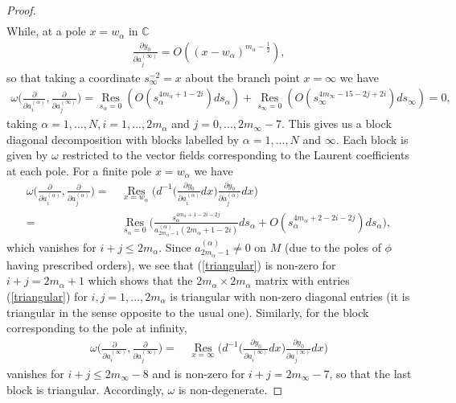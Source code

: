 \documentclass[a4paper,12pt,reqno]{amsart}
\numberwithin{equation}{section}
\numberwithin{counter2}{section}
\begin{document}
\begin{proof}
\begin{align}
\end{align}
While,  at a pole $x = w_\alpha$ in $\mathbb{C}$ 
\begin{align}\label{order_diff_inf_2}
\frac{\partial y_0}{\partial a_j^{(\infty)}} = O((x-w_\alpha)^{m_\alpha - \frac{1}{2}}),
\end{align}
so that taking a coordinate $s_\infty^{-2} = x$ about the branch point $x = \infty$ we have 
\begin{align}
\omega\bigg(\frac{\partial }{\partial a_i^{(\alpha)}},  \frac{\partial }{\partial a_j^{(\infty)}} \bigg) = \underset{s_\alpha=0}{\operatorname{Res}}(O(s_\alpha^{4m_\alpha+1-2i})ds_\alpha) + \underset{s_\infty = 0}{\operatorname{Res}}(O(s_\infty^{4m_\infty - 15 - 2j + 2i})ds_\infty)=0,
\end{align}
taking $\alpha = 1,...,N,  i = 1,...,2m_\alpha$ and $j = 0,..., 2m_\infty - 7$.  This gives us a block diagonal decomposition with blocks labelled by $\alpha = 1,...,N$ and $\infty$.  Each block is given by $\omega$ restricted to the vector fields corresponding to the Laurent coefficients at each pole.  For a finite pole $x = w_\alpha$ we have
\begin{align}\label{triangular}
\omega\bigg(\frac{\partial }{\partial a_i^{(\alpha)}},  \frac{\partial }{\partial a_j^{(\alpha)}} \bigg) \nonumber = \,  &\underset{x = w_\alpha}{\operatorname{Res}} \bigg(  d^{-1} \bigg( \frac{\partial y_0}{\partial a_i^{(\alpha)}}  dx \bigg)  \frac{\partial y_0}{\partial a_j^{(\alpha)}} dx \bigg) \\ = \,  &\underset{s_\alpha = 0}{\operatorname{Res}}\bigg( \frac{s_\alpha^{4m_\alpha+1-2i-2j}}{a^{(\alpha)}_{2m_\alpha-1}(2m_\alpha+1-2i)}ds_\alpha+ O(s_\alpha^{4m_\alpha+2-2i-2j})ds_\alpha\bigg),  
\end{align}
which vanishes for $i + j \le 2m_\alpha$.  Since $a_{2m_\alpha-1}^{(\alpha)} \ne 0$ on $M$ (due to the poles of $\phi$ having prescribed orders),  we see that (\ref{triangular}) is non-zero for $i + j = 2m_\alpha + 1$ which shows that the $2m_\alpha \times 2m_\alpha$ matrix with entries (\ref{triangular}) for $i,j = 1,...,2m_\alpha$ is triangular with non-zero diagonal entries (it is triangular in the sense opposite to the usual one). 
Similarly,  for the block corresponding to the pole at infinity,  
\begin{align}\label{triangular_inf}
\omega\bigg(\frac{\partial }{\partial a_i^{(\infty)}},  \frac{\partial }{\partial a_j^{(\infty)}} \bigg) = \,  &\underset{x = \infty}{\operatorname{Res}} \bigg( d^{-1} \bigg( \frac{\partial y_0}{\partial a_i^{(\infty)}}  dx \bigg)  \frac{\partial y_0}{\partial a_j^{(\infty)}} dx \bigg) 
\end{align}
vanishes for $i + j \le 2m_\infty-8$ and is non-zero for $i + j = 2m_\infty - 7$,  so that the last block is triangular.  
Accordingly,  $\omega$ is non-degenerate.  
\end{proof}
\end{document}
